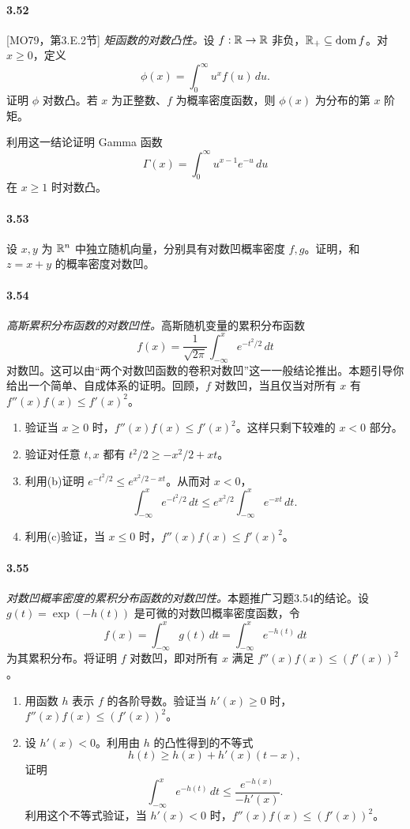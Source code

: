 \paragraph{3.52}[MO79，第3.E.2节] \textit{矩函数的对数凸性。}设 $f:\mathbb R\to\mathbb R$ 非负，$\mathbb R_+\subseteq\operatorname{dom} f$。对 $x\geq0$，定义
\[\phi(x)=\int_0^\infty u^xf(u)\,du.\]
证明 $\phi$ 对数凸。若 $x$ 为正整数、$f$ 为概率密度函数，则 $\phi(x)$ 为分布的第 $x$ 阶矩。

利用这一结论证明 Gamma 函数
\[\Gamma(x)=\int_0^\infty u^{x-1}e^{-u}\,du\]
在 $x\geq1$ 时对数凸。
\paragraph{3.53}设 $x,y$ 为 $\mathbb R^n$ 中独立随机向量，分别具有对数凹概率密度 $f,g$。证明，和 $z=x+y$ 的概率密度对数凹。
\paragraph{3.54}\textit{高斯累积分布函数的对数凹性。}高斯随机变量的累积分布函数
\[f(x)=\frac1{\sqrt{2\pi}}\int_{-\infty}^x e^{-t^2/2}\,dt\]
对数凹。这可以由“两个对数凹函数的卷积对数凹”这一一般结论推出。本题引导你给出一个简单、自成体系的证明。回顾，$f$ 对数凹，当且仅当对所有 $x$ 有 $f''(x)f(x)\leq f'(x)^2$。
\begin{enumerate}[label=(\alph*)]
\item 验证当 $x\geq0$ 时，$f''(x)f(x)\leq f'(x)^2$。这样只剩下较难的 $x<0$ 部分。
\item 验证对任意 $t,x$ 都有 $t^2/2\geq-x^2/2+xt$。
\item 利用(b)证明 $e^{-t^2/2}\leq e^{x^2/2-xt}$。从而对 $x<0$，
\[\int_{-\infty}^x e^{-t^2/2}\,dt\leq e^{x^2/2}\int_{-\infty}^x e^{-xt}\,dt.\]
\item 利用(c)验证，当 $x\leq0$ 时，$f''(x)f(x)\leq f'(x)^2$。
\end{enumerate}
\paragraph{3.55}\textit{对数凹概率密度的累积分布函数的对数凹性。}本题推广习题3.54的结论。设 $g(t)=\exp(-h(t))$ 是可微的对数凹概率密度函数，令
\[f(x)=\int_{-\infty}^x g(t)\,dt=\int_{-\infty}^x e^{-h(t)}\,dt\]
为其累积分布。将证明 $f$ 对数凹，即对所有 $x$ 满足 $f''(x)f(x)\leq(f'(x))^2$。
\begin{enumerate}[label=(\alph*)]
\item 用函数 $h$ 表示 $f$ 的各阶导数。验证当 $h'(x)\geq0$ 时，$f''(x)f(x)\leq(f'(x))^2$。
\item 设 $h'(x)<0$。利用由 $h$ 的凸性得到的不等式
\[h(t)\geq h(x)+h'(x)(t-x),\]
证明
\[\int_{-\infty}^x e^{-h(t)}\,dt\leq\frac{e^{-h(x)}}{-h'(x)}.\]
利用这个不等式验证，当 $h'(x)<0$ 时，$f''(x)f(x)\leq(f'(x))^2$。
\end{enumerate}
